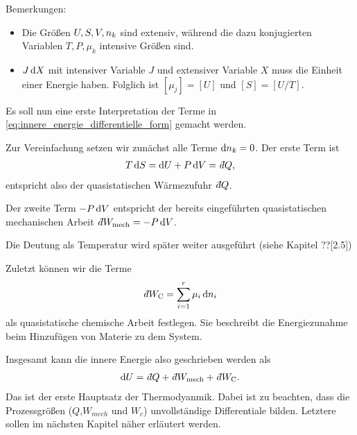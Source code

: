 Bemerkungen:
\begin{itemize}
    \item Die Größen $U, S,V,n_k$ sind extensiv, während die dazu konjugierten Variablen $T,P,\mu_k$ intensive Größen sind. 
    \item $J\mathop{}\!\mathrm{d} X$ mit intensiver Variable $J$ und extensiver Variable $X$ muss die Einheit einer Energie haben. Folglich ist $[\mu_j] = [U]$ und $[S]=[U/T]$. 
\end{itemize}

Es soll nun eine erste Interpretation der Terme in \eqref{eq:innere_energie_differentielle_form} gemacht werden. 

Zur Vereinfachung setzen wir zunächst alle Terme $\mathop{}\!\mathrm{d} n_k=0$. 
Der erste Term ist 
\begin{align*}
    T\diff S = \diff U+ P\diff V = \udiff Q,
\end{align*}
entspricht also der quasistatischen Wärmezufuhr $\udiff Q$. 

Der zweite Term $-P\mathop{}\!\mathrm{d} V$ entspricht der bereits eingeführten quasistatischen mechanischen Arbeit $\udiff W_\mathrm{mech}=-P\diff V$.


Die Deutung als Temperatur wird später weiter ausgeführt (siehe Kapitel ??[2.5])

Zuletzt können wir die Terme 
\begin{align*}
    \udiff W_ \mathrm{C} = \sum_{i = 1}^r \mu_i\diff \sm_i
\end{align*}
als quasistatische chemische Arbeit festlegen. Sie beschreibt die Energiezunahme beim Hinzufügen von Materie zu dem System. 

Insgesamt kann die innere Energie also geschrieben werden als
\begin{align}
    \label{eq:erster_HS_TD}
    \diff U = \udiff Q + \udiff W_\mathrm{mech} + \udiff W_\mathrm{C}.
\end{align}
Das ist der erste Hauptsatz der Thermodyanmik. 
Dabei ist zu beachten, dass die Prozessgrößen ($Q$,$W_{mech}$ und $W_c$) unvollständige Differentiale bilden. Letztere sollen im nächsten Kapitel näher erläutert werden. 


